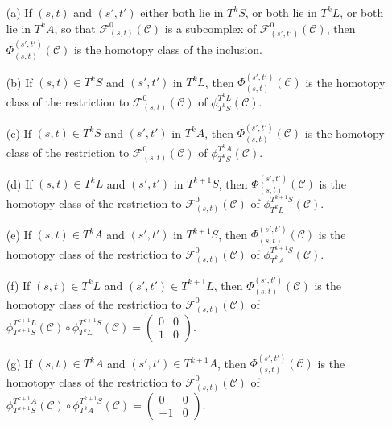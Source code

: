 \documentclass[11pt]{amsart}
\makeatletter
\def\namedlabel#1#2{\begingroup
	#2%
	\def\@currentlabel{#2}%
	\phantomsection\label{#1}\endgroup
}
\theoremstyle{definition}
\theoremstyle{remark}
\numberwithin{equation}{section}
\makeatother
\begin{document}
\begin{enumerate}
	\item[\namedlabel{(a)}{(a)}] If $(s,t)$ and $(s',t')$ either both lie in $T^kS$, or both lie in $T^kL$, or both lie in $T^{k}A$, so that $\mathcal{F}^{0}_{(s,t)}(\mathcal{C})$ is a subcomplex of $\mathcal{F}^{0}_{(s',t')}(\mathcal{C})$, then  $\Phi_{(s,t)}^{(s',t')}(\mathcal{C})$  is the homotopy class of the inclusion.
	\item[\namedlabel{(b)}{(b)}] If $(s,t)\in T^kS$ and $(s',t')$ in $T^kL$, then  $\Phi_{(s,t)}^{(s',t')}(\mathcal{C})$  is the homotopy class of the restriction to $\mathcal{F}^{0}_{(s,t)}(\mathcal{C})$ of  $\phi_{T^kS}^{T^kL}(\mathcal{C})$.
	\item[\namedlabel{(c)}{(c)}] If $(s,t)\in T^kS$ and $(s',t')$ in $T^kA$, then  $\Phi_{(s,t)}^{(s',t')}(\mathcal{C})$  is the homotopy class of the restriction to $\mathcal{F}^{0}_{(s,t)}(\mathcal{C})$ of  $\phi_{T^kS}^{T^kA}(\mathcal{C})$.
	\item[\namedlabel{(d)}{(d)}] If $(s,t)\in T^kL$ and $(s',t')$ in $T^{k+1}S$, then  $\Phi_{(s,t)}^{(s',t')}(\mathcal{C})$  is the homotopy class of the restriction to $\mathcal{F}^{0}_{(s,t)}(\mathcal{C})$ of  $\phi_{T^kL}^{T^{k+1}S}(\mathcal{C})$.
	\item[\namedlabel{(e)}{(e)}] If $(s,t)\in T^kA$ and $(s',t')$ in $T^{k+1}S$, then  $\Phi_{(s,t)}^{(s',t')}(\mathcal{C})$  is the homotopy class of the restriction to $\mathcal{F}^{0}_{(s,t)}(\mathcal{C})$ of  $\phi_{T^kA}^{T^{k+1}S}(\mathcal{C})$.
	\item[\namedlabel{(f)}{(f)}] If $(s,t)\in T^kL$ and $(s',t')\in T^{k+1}L$, then   $\Phi_{(s,t)}^{(s',t')}(\mathcal{C})$  is the homotopy class of the restriction to $\mathcal{F}^{0}_{(s,t)}(\mathcal{C})$ of $\phi_{T^{k+1}S}^{T^{k+1}L}(\mathcal{C})\circ \phi_{T^kL}^{T^{k+1}S}(\mathcal{C})=\left(\begin{array}{cc}0 & 0 \\ 1 & 0\end{array}\right)$.
	\item[\namedlabel{(g)}{(g)}] If $(s,t)\in T^kA$ and $(s',t')\in T^{k+1}A$, then   $\Phi_{(s,t)}^{(s',t')}(\mathcal{C})$  is the homotopy class of the restriction to $\mathcal{F}^{0}_{(s,t)}(\mathcal{C})$ of $\phi_{T^{k+1}S}^{T^{k+1}A}(\mathcal{C})\circ \phi_{T^kA}^{T^{k+1}S}(\mathcal{C})=\left(\begin{array}{cc}0 & 0 \\ -1 & 0\end{array}\right)$.

\end{enumerate}
\end{document}
